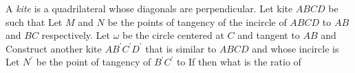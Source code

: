 A \textit{kite} is a quadrilateral whose diagonals are perpendicular.  Let kite $ABCD$ be such that   Let $M$ and $N$ be the points of tangency of the incircle of $ABCD$ to $AB$ and $BC$ respectively.  Let $\omega$ be the circle centered at $C$ and tangent to $AB$ and   Construct another kite $AB^\prime C^\prime D^\prime$ that is similar to $ABCD$ and whose incircle is   Let $N^\prime$ be the point of tangency of $B^\prime C^\prime$ to   If  then what is the ratio of 
